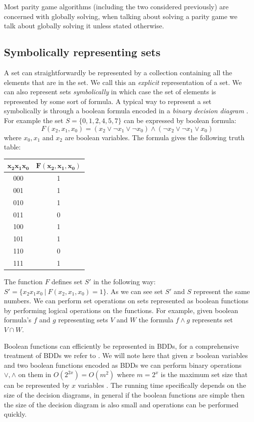 Most parity game algorithms (including the two considered previously) are concerned with globally solving, when talking about solving a parity game we talk about globally solving it unless stated otherwise. 

\subsection{Symbolically representing sets}
A set can straightforwardly be represented by a collection containing all the elements that are in the set. We call this an \textit{explicit} representation of a set. We can also represent sets \textit{symbolically} in which case the set of elements is represented by some sort of formula. A typical way to represent a set symbolically is through a boolean formula encoded in a \textit{binary decision diagram} \cite{BDD_book,Handbook_BDD_Chapter}. For example the set $S = \{0,1,2,4,5,7 \}$ can be expressed by boolean formula:
\[ F(x_2,x_1,x_0) = (x_2 \vee \neg x_1 \vee \neg x_0) \wedge (\neg x_2 \vee \neg x_1 \vee x_0) \]
where $x_0,x_1$ and $x_2$ are boolean variables. The formula gives the following truth table:\\
\begin{center}
	\begin{tabular}{|c|c|}
		\hline 
		$\mathbf{x_2x_1x_0}$ & $\mathbf{F(x_2,x_1,x_0)}$ \\ 
		\hline 
		000 & 1 \\ 
		\hline 
		001 & 1 \\ 
		\hline 
		010 & 1 \\ 
		\hline 
		011 & 0 \\ 
		\hline 
		100 & 1 \\ 
		\hline 
		101 & 1 \\ 
		\hline 
		110 & 0 \\ 
		\hline 
		111 & 1 \\ 
		\hline 
	\end{tabular} 
\end{center}
The function $F$ defines set $S'$ in the following way: $S' = \{x_2x_1x_0\ |\ F(x_2,x_1,x_0) = 1 \}$. As we can see set $S'$ and $S$ represent the same numbers. We can perform set operations on sets represented as boolean functions by performing logical operations on the functions. For example, given boolean formula's $f$ and $g$ representing sets $V$ and $W$ the formula $f \wedge g$ represents set $V \cap W$.

Boolean functions can efficiently be represented in BDDs, for a comprehensive treatment of BDDs we refer to \cite{BDD_book,Handbook_BDD_Chapter}. We will note here that given $x$ boolean variables and two boolean functions encoded as BDDs we can perform binary operations $\vee,\wedge$ on them in $O(2^{2x})=O(m^2)$ where $m = 2^x$ is the maximum set size that can be represented by $x$ variables \cite{BDD_running_time,Handbook_BDD_Chapter}. The running time specifically depends on the size of the decision diagrams, in general if the boolean functions are simple then the size of the decision diagram is also small and operations can be performed quickly.